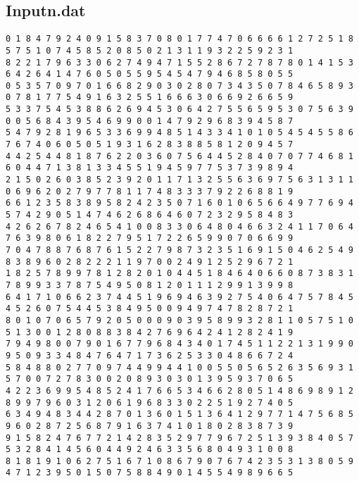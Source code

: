 \subsection{Inputn.dat}
\begin{verbatim}
0 1 8 4 7 9 2 4 0 9 1 5 8 3 7 0 8 0 1 7 7 4 7 0 6 6 6 6 1 2 7 2 5 1 8 5 7 5 1 0 7 4 5 8 5 2 0 8 5 0 2 1 3 1 1 9 3 2 2 5 9 2 3 1
8 2 2 1 7 9 6 3 3 0 6 2 7 4 9 4 7 1 5 5 2 8 6 7 2 7 8 7 8 0 1 4 1 5 3 6 4 2 6 4 1 4 7 6 0 5 0 5 5 9 5 4 5 4 7 9 4 6 8 5 8 0 5 5
0 5 3 5 7 0 9 7 0 1 6 6 8 2 9 0 3 0 2 8 0 7 3 4 3 5 0 7 8 4 6 5 8 9 3 0 7 8 1 7 7 5 4 9 1 6 3 2 5 5 1 6 6 6 3 0 6 6 9 2 6 6 5 9
5 3 3 7 5 4 5 3 8 8 6 2 6 9 4 5 3 0 6 4 2 7 5 5 6 5 9 5 3 0 7 5 6 3 9 0 0 5 6 8 4 3 9 5 4 6 9 9 0 0 1 4 7 9 2 9 6 8 3 9 4 5 8 7
5 4 7 9 2 8 1 9 6 5 3 3 6 9 9 4 8 5 1 4 3 3 4 1 0 1 0 5 4 5 4 5 5 8 6 7 6 7 4 0 6 0 5 0 5 1 9 3 1 6 2 8 3 8 8 5 8 1 2 0 9 4 5 7
4 4 2 5 4 4 8 1 8 7 6 2 2 0 3 6 0 7 5 6 4 4 5 2 8 4 0 7 0 7 7 4 6 8 1 6 0 4 4 7 1 3 8 1 3 3 4 5 5 1 9 4 5 9 7 7 5 3 7 3 9 8 9 4
2 1 5 0 2 6 0 3 8 5 2 3 9 2 0 1 1 7 1 3 2 5 5 6 3 6 9 7 5 6 3 1 3 1 1 0 6 9 6 2 0 2 7 9 7 7 8 1 1 7 4 8 3 3 3 7 9 2 2 6 8 8 1 9
6 6 1 2 3 5 8 3 8 9 5 8 2 4 2 3 5 0 7 1 6 0 1 0 6 5 6 6 4 9 7 7 6 9 4 5 7 4 2 9 0 5 1 4 7 4 6 2 6 8 6 4 6 0 7 2 3 2 9 5 8 4 8 3
4 2 6 2 6 7 8 2 4 6 5 4 1 0 0 8 3 3 0 6 4 8 0 4 6 6 3 2 4 1 1 7 0 6 4 7 6 3 9 8 0 6 1 8 2 2 7 9 5 1 7 2 2 6 5 9 9 0 7 0 6 6 9 9
7 0 4 7 8 8 7 6 8 7 6 1 5 2 2 7 9 8 7 3 2 3 5 1 6 9 1 5 0 4 6 2 5 4 9 8 3 8 9 6 0 2 8 2 2 2 1 1 9 7 0 0 2 4 9 1 2 5 2 9 6 7 2 1
1 8 2 5 7 8 9 9 7 8 1 2 8 2 0 1 0 4 4 5 1 8 4 6 4 0 6 6 0 8 7 3 8 3 1 7 8 9 9 3 3 7 8 7 5 4 9 5 0 8 1 2 0 1 1 1 2 9 9 1 3 9 9 8
6 4 1 7 1 0 6 6 2 3 7 4 4 5 1 9 6 9 4 6 3 9 2 7 5 4 0 6 4 7 5 7 8 4 5 4 5 2 6 0 7 5 4 4 5 3 8 4 9 5 0 0 9 4 9 7 4 7 8 2 8 7 2 1
8 0 1 0 7 0 6 5 7 9 2 0 5 0 0 0 9 0 3 9 5 8 9 9 3 2 8 1 1 0 5 7 5 1 0 5 1 3 0 0 1 2 8 0 8 8 3 8 4 2 7 6 9 6 4 2 4 1 2 8 2 4 1 9
7 9 4 9 8 0 0 7 9 0 1 6 7 7 9 6 8 4 3 4 0 1 7 4 5 1 1 2 2 1 3 1 9 9 0 9 5 0 9 3 3 4 8 4 7 6 4 7 1 7 3 6 2 5 3 3 0 4 8 6 6 7 2 4
5 8 4 8 8 0 2 7 7 0 9 7 4 4 9 9 4 4 1 0 0 5 5 0 5 6 5 2 6 3 5 6 9 3 1 5 7 0 0 7 2 7 8 3 0 0 2 0 8 9 3 0 3 0 1 3 9 5 9 3 7 0 6 5
4 2 2 3 6 9 9 5 4 8 5 2 4 1 7 6 6 5 3 4 6 6 2 8 0 5 1 4 8 6 9 8 9 1 2 8 9 9 7 9 6 0 3 1 2 0 6 1 9 6 8 3 3 0 2 2 5 1 9 2 7 4 0 5
6 3 4 9 4 8 3 4 4 2 8 7 0 1 3 6 0 1 5 1 3 6 4 1 2 9 7 7 1 4 7 5 6 8 5 9 6 0 2 8 7 2 5 6 8 7 9 1 6 3 7 4 1 0 1 8 0 2 8 3 8 7 3 9
9 1 5 8 2 4 7 6 7 7 2 1 4 2 8 3 5 2 9 7 7 9 6 7 2 5 1 3 9 3 8 4 0 5 7 5 3 2 8 4 1 4 5 6 0 4 4 9 2 4 6 3 3 5 6 8 0 4 9 3 1 0 0 8
8 1 8 1 9 1 0 6 2 7 5 1 6 7 1 0 8 6 7 9 0 7 6 7 4 2 3 5 3 1 3 8 0 5 9 4 7 1 2 3 9 5 0 1 5 0 7 5 8 8 4 9 0 1 4 5 5 4 9 8 9 6 6 5

\end{verbatim}
